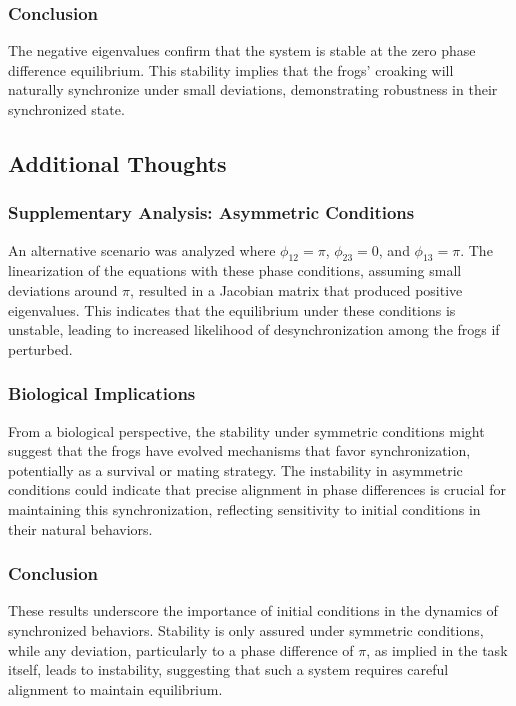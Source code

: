 \documentclass[12pt,a4paper]{article}
\begin{document}
\subsubsection{Conclusion}
The negative eigenvalues confirm that the system is stable at the zero phase difference equilibrium. This stability implies that the frogs' croaking will naturally synchronize under small deviations, demonstrating robustness in their synchronized state.


\subsection{Additional Thoughts}

\subsubsection{Supplementary Analysis: Asymmetric Conditions}
An alternative scenario was analyzed where \(\phi_{12} = \pi\), \(\phi_{23} = 0\), and \(\phi_{13} = \pi\). The linearization of the equations with these phase conditions, assuming small deviations around \(\pi\), resulted in a Jacobian matrix that produced positive eigenvalues. This indicates that the equilibrium under these conditions is unstable, leading to increased likelihood of desynchronization among the frogs if perturbed.

\subsubsection{Biological Implications}
From a biological perspective, the stability under symmetric conditions might suggest that the frogs have evolved mechanisms that favor synchronization, potentially as a survival or mating strategy. The instability in asymmetric conditions could indicate that precise alignment in phase differences is crucial for maintaining this synchronization, reflecting sensitivity to initial conditions in their natural behaviors.

\subsubsection{Conclusion}
These results underscore the importance of initial conditions in the dynamics of synchronized behaviors. Stability is only assured under symmetric conditions, while any deviation, particularly to a phase difference of \(\pi\), as implied in the task itself, leads to instability, suggesting that such a system requires careful alignment to maintain equilibrium.
\end{document}
